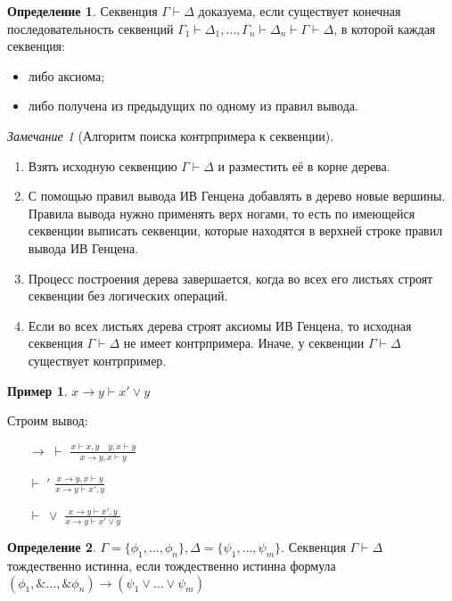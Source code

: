 \documentclass[a4paper]{article}
\theoremstyle{definition}
\newtheorem*{example}{Пример}
\newtheorem*{definition}{Определение}
\theoremstyle{remark}
\newtheorem*{remark}{Замечание}
\begin{document}
    \begin{definition}
        Секвенция $\Gamma\vdash \Delta$ доказуема, если существует конечная последовательность секвенций
        $\Gamma_1\vdash \Delta_1, \dots, \Gamma_n\vdash \Delta_n\vdash \Gamma\vdash \Delta$, в которой каждая секвенция:
        \begin{itemize}
            \item либо аксиома;
            \item либо получена из предыдущих по одному из правил вывода.
        \end{itemize}
    \end{definition}
    \begin{remark}[Алгоритм поиска контрпримера к секвенции]
        \begin{enumerate}
            \item  Взять исходную секвенцию $\Gamma\vdash \Delta$ и разместить её в корне дерева.
            \item С помощью правил вывода ИВ Генцена добавлять в дерево новые вершины.
            Правила вывода нужно применять верх ногами, то есть по имеющейся секвенции выписать секвенции, которые находятся в верхней строке правил вывода
            ИВ Генцена.
            \item Процесс построения дерева завершается, когда во всех его листьях строят секвенции без логических операций.
            \item Если во всех листьях дерева строят аксиомы ИВ Генцена, то исходная секвенция $\Gamma\vdash \Delta$ не имеет контрпримера. Иначе, у секвенции $\Gamma\vdash \Delta$ существует
            контрпример.
        \end{enumerate}
    \end{remark}
    \begin{example}
        $x\to y\vdash x' \vee y$

        Строим вывод:
        \begin{itemize}
            \item [$\to\;\vdash$] $\frac{x\vdash x, y\quad y, x\vdash y}{x\to y, x \vdash y}$
            \item [$\vdash\; '$] $\frac{x\to y, x \vdash y}{x\to y\vdash x', y}$
            \item [$\vdash\;\vee$]$\frac{x\to y\vdash x', y}{x\to y \vdash x' \vee y}$
        \end{itemize}
    \end{example}
    \begin{definition}
        $\Gamma = \{ \phi_1, \dots, \phi_n\}, \Delta = \{ \psi_1, \dots, \psi_m\} $. Секвенция
        $\Gamma \vdash \Delta$ тождественно истинна, если тождественно истинна формула
        $(\phi_1, \& \dots, \&\phi_n) \to (\psi_1\vee \dots \vee\psi_m)$
    \end{definition}
\end{document}

